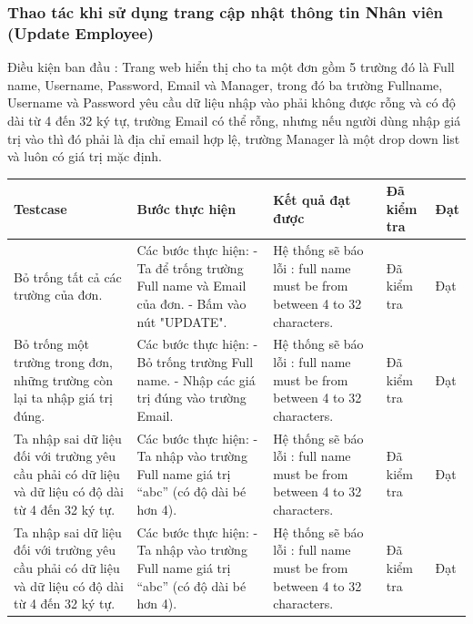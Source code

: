 \documentclass{article}
\begin{document}
\subsubsection{Thao tác khi sử dụng trang cập nhật thông tin Nhân viên  (Update Employee) }
Điều kiện ban đầu : Trang web hiển thị cho ta một đơn gồm 5 trường đó là Full name, Username, Password, Email và Manager, trong đó ba trường Fullname, Username và Password yêu cầu dữ liệu nhập vào phải không được rỗng và có độ dài từ 4 đến 32 ký tự, trường Email có thể rỗng, nhưng nếu người dùng nhập giá trị vào thì đó phải là địa chỉ email hợp lệ, trường Manager là một drop down list và luôn có giá trị mặc định. \newline
\begin{longtable}{ | p{} |p{} | p{}  | p{}  | p{}  | } 
\hline
\textbf{Testcase}& \textbf{Bước thực hiện}& \textbf{Kết quả đạt được} & \textbf{Đã kiểm tra}& \textbf{Đạt} \\ 
\hline
\hline
Bỏ trống tất cả các trường của đơn. &
Các bước thực hiện: \newline
- Ta để trống trường Full name và Email của đơn.
- Bấm vào nút "UPDATE".
&
Hệ thống sẽ báo lỗi : full name must be from between 4 to 32 characters.
 &
Đã kiểm tra &
Đạt \\

\hline
Bỏ trống một trường trong đơn, những trường còn lại ta nhập giá trị đúng. &
Các bước thực hiện: \newline
- Bỏ trống trường Full name. 
- Nhập các giá trị đúng vào trường Email. 
&
Hệ thống sẽ báo lỗi : full name must be from between 4 to 32 characters.
 &
Đã kiểm tra &
Đạt \\

\hline
Ta nhập sai dữ liệu đối với trường yêu cầu phải có dữ liệu và dữ liệu có độ dài từ 4 đến 32 ký tự. &
Các bước thực hiện: \newline
- Ta nhập vào trường Full name giá trị “abc” (có độ dài bé hơn 4).  
&
Hệ thống sẽ báo lỗi : full name must be from between 4 to 32 characters.
 &
Đã kiểm tra &
Đạt \\

\hline
Ta nhập sai dữ liệu đối với trường yêu cầu phải có dữ liệu và dữ liệu có độ dài từ 4 đến 32 ký tự. &
Các bước thực hiện: \newline
- Ta nhập vào trường Full name giá trị “abc” (có độ dài bé hơn 4).  
&
Hệ thống sẽ báo lỗi : full name must be from between 4 to 32 characters.
 &
Đã kiểm tra &
Đạt \\


\end{longtable}
\end{document}
